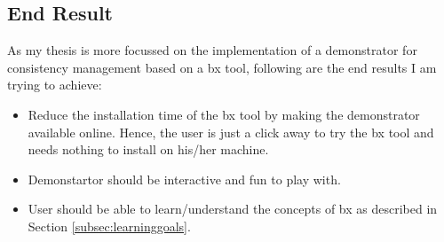 \subsection{End Result}\label{subsec:endresult}
As my thesis is more focussed on the implementation of a demonstrator for consistency management based on a bx tool, following are the end results I am trying to achieve:
\begin{itemize} 
	\item {Reduce the installation time of the bx tool by making the demonstrator available online. Hence, the user is just a click away to try the bx tool and needs nothing to install on his/her machine.} 
	\item {Demonstartor should be interactive and fun to play with.}
	\item {User should be able to learn/understand the concepts of bx as described in Section \ref{subsec:learninggoals}.}
\end{itemize}











